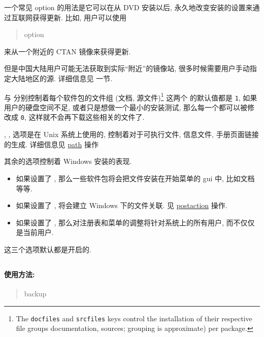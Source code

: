 一个常见 \ac{option} 的用法是它可以在从 DVD 安装以后, 永久地改变安装的设置来通过互联网获得更新. 比如, 用户可以使用
\begin{quote}
    \tlmgr{} \ac{option}  
\end{quote}
来从一个附近的 CTAN 镜像来获得更新. 

但是中国大陆用户可能无法获取到实际``附近''的镜像站, 很多时候需要用户手动指定大陆地区的源. 详细信息见  一节. 

 与  分别控制着每个软件包的文件组 (文档, 源文件)\footnote{The \texttt{\scriptsize docfiles} and \texttt{\scriptsize srcfiles} keys control the installation of their respective file groups documentation, sources; grouping is approximate) per package.} 这两个  的默认值都是 \texttt{1}, 如果用户的硬盘空间不足, 或者只是想做一个最小的安装测试, 那么每一个都可以被修改成 \texttt{0}, 这样就不会再下载这些相关的文件了. 

, ,  选项是在 Unix 系统上使用的, 控制着对于可执行文件, 信息文件, 手册页面链接的生成. 详细信息见 \href{https://www.tug.org/texlive/doc/tlmgr.html#path}{path} 操作

其余的选项控制着 Windows 安装的表现. 
\begin{itemize}
    \item 如果设置了 , 那么一些软件包将会把文件安装在开始菜单的 \tlmgr{} \ac{gui} 中, 比如文档等等. 
    \item 如果设置了 , 将会建立 Windows 下的文件关联. 见 \href{https://www.tug.org/texlive/doc/tlmgr.html#postaction}{\ac{postaction}} 操作. 
    \item 如果设置了 , 那么对注册表和菜单的调整将针对系统上的所有用户, 而不仅仅是当前用户. 
\end{itemize}
这三个选项默认都是开启的. 

\clearpage

\subsection{}\label{subsec:backup}
\paragraph{使用方法:}

\begin{quote}
    \tlmgr{} \ac{backup} 
\end{quote}

